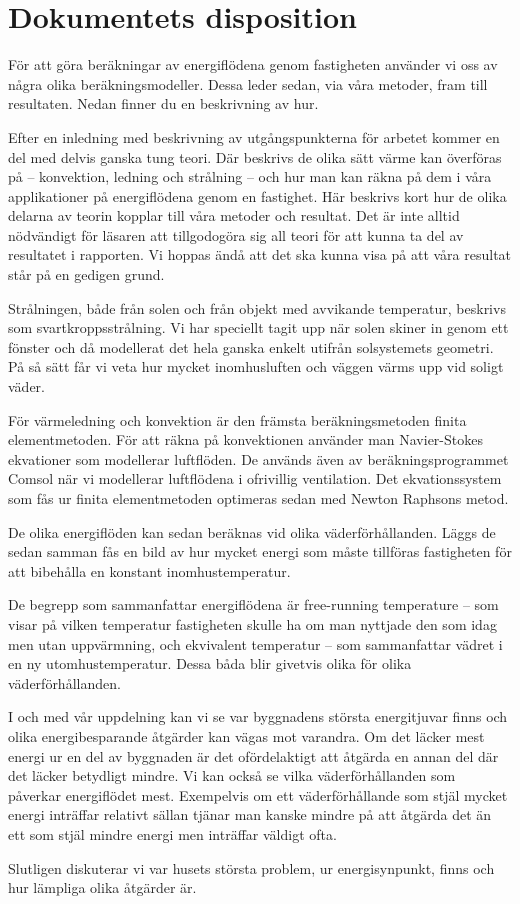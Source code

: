\section{Dokumentets disposition}

För att göra beräkningar av energiflödena genom fastigheten använder vi oss av några olika beräkningsmodeller. Dessa leder sedan, via våra metoder, fram till resultaten. Nedan finner du en beskrivning av hur.

Efter en inledning med beskrivning av utgångspunkterna för arbetet kommer en del med
 delvis ganska tung teori. Där beskrivs de olika sätt värme kan överföras på – konvektion,
  ledning och strålning – och hur man kan räkna på dem i våra applikationer på 
  energiflödena genom en fastighet. Här beskrivs kort hur de olika delarna av teorin 
  kopplar till våra metoder och resultat. Det är inte alltid nödvändigt för läsaren att 
  tillgodogöra sig all teori för att kunna ta del av resultatet i rapporten. Vi hoppas ändå att 
  det ska kunna visa på att våra resultat står på en gedigen grund.

Strålningen, både från solen och från objekt med avvikande temperatur, beskrivs som 
svartkroppsstrålning. Vi har speciellt tagit upp när solen skiner in genom ett fönster och då 
modellerat det hela ganska enkelt utifrån solsystemets geometri. På så sätt får vi veta hur 
mycket inomhusluften och väggen värms upp vid soligt väder.

För värmeledning och konvektion är den främsta beräkningsmetoden finita 
elementmetoden. För att räkna på konvektionen använder man Navier-Stokes ekvationer 
som modellerar luftflöden. De används även av beräkningsprogrammet Comsol när vi 
modellerar luftflödena i ofrivillig ventilation. Det ekvationssystem som fås ur finita
 elementmetoden optimeras sedan med Newton Raphsons metod.

De olika energiflöden kan sedan beräknas vid olika väderförhållanden. Läggs de 
sedan samman fås en bild av hur mycket energi som måste tillföras fastigheten för att 
bibehålla en konstant inomhustemperatur.

De begrepp som sammanfattar energiflödena är free-running temperature – som visar på 
vilken temperatur fastigheten skulle ha om man nyttjade den som idag men utan 
uppvärmning, och ekvivalent temperatur – som sammanfattar vädret i en ny utomhustemperatur. Dessa båda blir givetvis olika för olika väderförhållanden.

I och med vår uppdelning kan vi se var byggnadens största energitjuvar finns och 
olika energibesparande åtgärder kan vägas mot varandra. Om det läcker mest energi ur
 en del av byggnaden är det ofördelaktigt att åtgärda en annan del där det läcker betydligt
  mindre. Vi kan också se vilka väderförhållanden som påverkar energiflödet mest. 
Exempelvis om ett väderförhållande som stjäl mycket energi inträffar relativt sällan tjänar
 man kanske mindre på att åtgärda det än ett som stjäl mindre energi men inträffar väldigt 
 ofta.

Slutligen diskuterar vi var husets största problem, ur energisynpunkt, finns och hur lämpliga olika åtgärder är.
